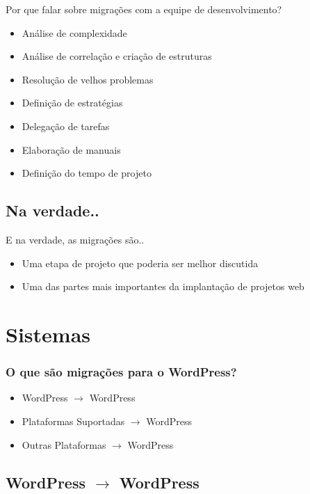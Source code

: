 \documentclass{beamer}
\begin{document}
\begin{frame}{Por que falar sobre migrações com a equipe de desenvolvimento?}
\begin{itemize}
  \pause \item Análise de complexidade
  \pause \item Análise de correlação e criação de estruturas
  \pause \item Resolução de velhos problemas
  \pause \item Definição de estratégias
  \pause \item Delegação de tarefas
  \pause \item Elaboração de manuais
  \pause \item Definição do tempo de projeto
\end{itemize}
\end{frame}

\subsection{Na verdade..}

\begin{frame}{E na verdade, as migrações são..}
\begin{itemize}
  \pause \item Uma etapa de projeto que poderia ser melhor discutida
  \pause \item Uma das partes mais importantes da implantação de projetos web
\end{itemize}
\end{frame}


\section{Sistemas}

\begin{frame}
\frametitle{O que são migrações para o WordPress?}
\begin{itemize}
  \pause \item WordPress $\rightarrow$ WordPress
  \pause \item Plataformas Suportadas $\rightarrow$ WordPress
  \pause \item Outras Plataformas $\rightarrow$ WordPress
\end{itemize}
\end{frame}

\subsection{WordPress $\rightarrow$ WordPress}
\end{document}

